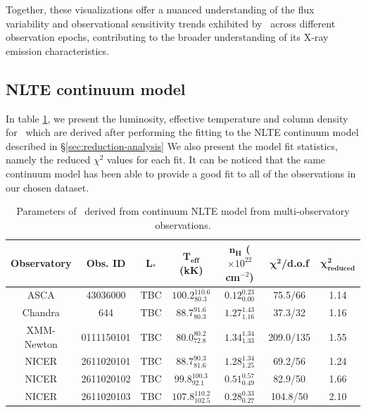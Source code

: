     Together, these visualizations offer a nuanced understanding of the flux variability and observational sensitivity trends exhibited by \source\ across different observation epochs, contributing to the broader understanding of its X-ray emission characteristics.
    
    \subsection{NLTE continuum model}
    In table \ref{tab:res-fitting}, we present the luminosity, effective temperature and column density for \source\ which are derived after performing the fitting to the NLTE continuum model described in \S \ref{sec:reduction-analysis} We also present the model fit statistics, namely the reduced $\chi^2$ values for each fit. It can be noticed that the same continuum model has been able to provide a good fit to all of the observations in our chosen dataset.
    \begin{table}[!htb]
    	\centering
    	\caption{Parameters of \source\ derived from continuum NLTE model from multi-observatory observations.}
    	\label{tab:res-fitting}
    	\begin{tabular}{ccccccc}
			\hline
			{\textbf{Observatory}} & {\textbf{Obs. ID}} & {$\boldsymbol{L_*}$} & {\textbf{$\boldsymbol{T_\text{eff}}$ (kK)}} & {\textbf{$\boldsymbol{n_H}$ ($\times 10^{22}$ cm$^{-2}$)}} & {$\boldsymbol{\chi^2}$/\textbf{d.o.f}} & {$\boldsymbol{\chi^2_\text{reduced}}$} \\
			\hline
			{ASCA} & {43036000} & {TBC} & {$100.2_{80.3}^{110.6}$} & {$0.12_{0.00}^{0.23}$} & {75.5/66} & {1.14} \\
			{Chandra} & {644} & {TBC} & {$88.7_{80.3}^{91.6}$} & {$1.27_{1.16}^{1.43}$} & {37.3/32} & {1.16} \\
			{XMM-Newton} & {0111150101} & {TBC} & {$80.0_{72.8}^{80.2}$} & {$1.34_{1.33}^{1.34}$} & {209.0/135} & {1.55} \\
			{NICER} & {2611020101} & {TBC} & {$88.7_{81.6}^{90.3}$} & {$1.28_{1.25}^{1.34}$} & {69.2/56} & {1.24} \\
			{NICER} & {2611020102} & {TBC} & {$99.8_{92.1}^{100.3}$} & {$0.51_{0.49}^{0.57}$} & {82.9/50} & {1.66} \\
			{NICER} & {2611020103} & {TBC} & {$107.8_{102.5}^{110.2}$} & {$0.28_{0.27}^{0.33}$} & {104.8/50} & {2.10} \\
			\hline
		\end{tabular}
	\end{table}
    
